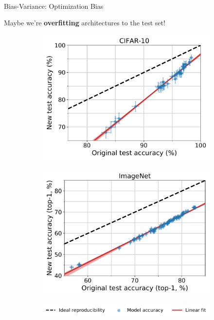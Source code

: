 \documentclass[notheorems]{beamer}
\begin{document}
    \begin{frame}{Bias-Variance: Optimization Bias}

        Maybe we're \textbf{overfitting} architectures to the test set!

        \begin{figure}
            \centering
            \begin{subfigure}{0.48\textwidth}
                \includegraphics[width=\linewidth]{figures/intro_plot_cifar10_without_legend.pdf}
            \end{subfigure}
            \hfill
            \begin{subfigure}{0.48\textwidth}
                \includegraphics[width=\linewidth]{figures/intro_plot_imagenet_without_legend.pdf}
            \end{subfigure}
            \begin{subfigure}{\textwidth}
                \vspace{-.15cm}
                \centering
                \includegraphics[width=.75\linewidth]{figures/intro_plot_separate_legend_horizontal.pdf}
            \end{subfigure}
        \end{figure}


\end{frame}
\end{document}

